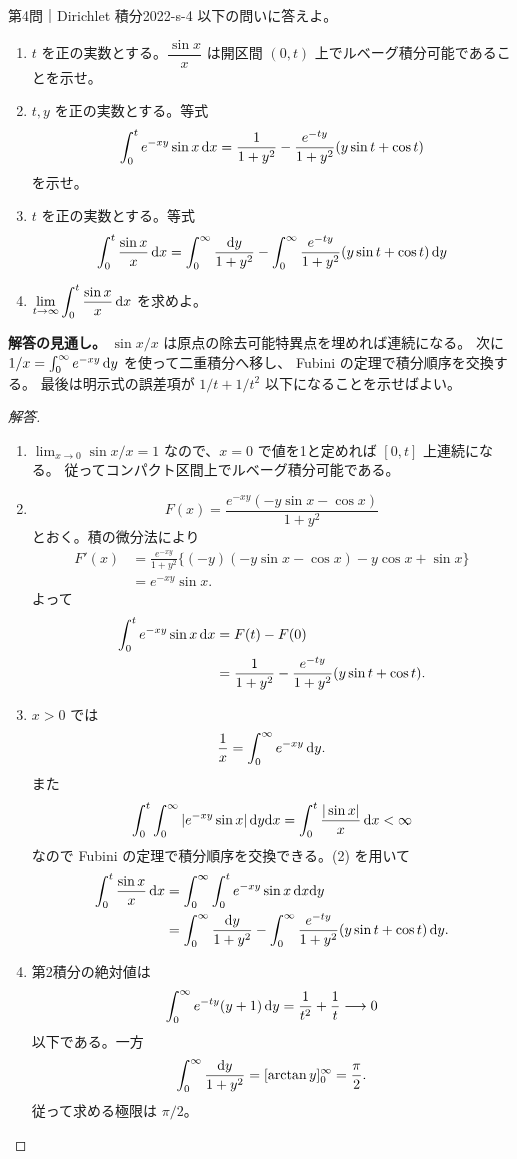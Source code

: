 \begin{problem}{第4問｜Dirichlet 積分}{2022-s-4}
以下の問いに答えよ。
\begin{enumerate}
  \item[(1)] $t$ を正の実数とする。$\dfrac{\sin x}x$ は開区間 $(0,t)$ 上でルベーグ積分可能であることを示せ。
  \item[(2)] $t,y$ を正の実数とする。等式
  \[
  \int_0^t e^{-xy}\sin x\,\mathrm{d} x
  =\frac1{1+y^2}-\frac{e^{-ty}}{1+y^2}(y\sin t+\cos t)
  \]
  を示せ。
  \item[(3)] $t$ を正の実数とする。等式
  \[
  \int_0^t\frac{\sin x}{x}\,\mathrm{d} x
  =\int_0^\infty\frac{\mathrm{d} y}{1+y^2}
  -\int_0^\infty\frac{e^{-ty}}{1+y^2}(y\sin t+\cos t)\,\mathrm{d} y
  \]
  \item[(4)] $\displaystyle\lim_{t\to\infty}\int_0^t\frac{\sin x}{x}\,\mathrm{d} x$ を求めよ。
\end{enumerate}
\end{problem}
\begin{memo*}
\textbf{解答の見通し。}
$\sin x/x$ は原点の除去可能特異点を埋めれば連続になる。
次に $1/x=\int_0^\infty e^{-xy}\,\mathrm{d} y$ を使って二重積分へ移し、
Fubini の定理で積分順序を交換する。
最後は明示式の誤差項が $1/t+1/t^2$ 以下になることを示せばよい。
\end{memo*}
\begin{proof}[解答]
\begin{enumerate}
  \item[(1)] $\lim_{x\to0}\sin x/x=1$ なので、$x=0$ で値を1と定めれば $[0,t]$ 上連続になる。
  従ってコンパクト区間上でルベーグ積分可能である。
  \item[(2)]
  \[
  F(x)=\frac{e^{-xy}(-y\sin x-\cos x)}{1+y^2}
  \]
  とおく。積の微分法により
  \begin{align*}
  F'(x)
  &=\frac{e^{-xy}}{1+y^2}
  \{(-y)(-y\sin x-\cos x)-y\cos x+\sin x\}\\
  &=e^{-xy}\sin x.
  \end{align*}
  よって
  \begin{align*}
  \int_0^t e^{-xy}\sin x\,\mathrm{d} x
  &=F(t)-F(0)\\
  &=\frac1{1+y^2}
   -\frac{e^{-ty}}{1+y^2}(y\sin t+\cos t).
  \end{align*}
  \item[(3)] $x>0$ では
  \[
  \frac1x=\int_0^\infty e^{-xy}\,\mathrm{d} y.
  \]
  また
  \[
  \int_0^t\int_0^\infty|e^{-xy}\sin x|\,\mathrm{d} y\mathrm{d} x
  =\int_0^t\frac{|\sin x|}{x}\,\mathrm{d} x<\infty
  \]
  なので Fubini の定理で積分順序を交換できる。(2) を用いて
  \begin{align*}
  \int_0^t\frac{\sin x}{x}\,\mathrm{d} x
  &=\int_0^\infty\int_0^t e^{-xy}\sin x\,\mathrm{d} x\mathrm{d} y\\
  &=\int_0^\infty\frac{\mathrm{d} y}{1+y^2}
  -\int_0^\infty\frac{e^{-ty}}{1+y^2}(y\sin t+\cos t)\,\mathrm{d} y.
  \end{align*}
  \item[(4)] 第2積分の絶対値は
  \[
  \int_0^\infty e^{-ty}(y+1)\,\mathrm{d} y
  =\frac1{t^2}+\frac1t\longrightarrow0
  \]
  以下である。一方
  \[
  \int_0^\infty\frac{\mathrm{d} y}{1+y^2}
  =[\arctan y]_0^\infty=\frac\pi2.
  \]
  従って求める極限は $\pi/2$。
\end{enumerate}
\end{proof}

